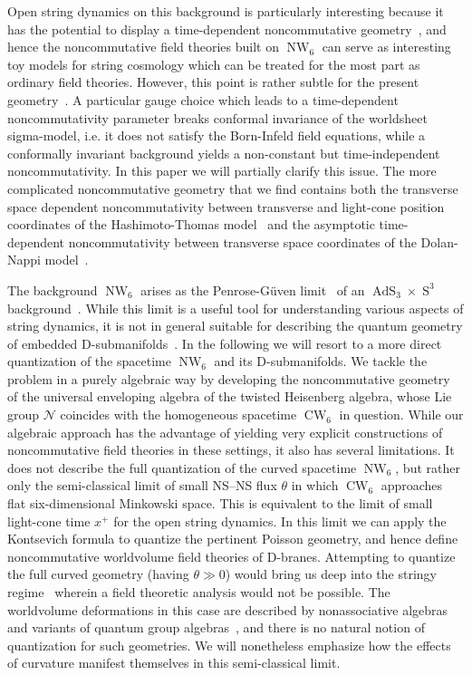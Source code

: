 \documentclass[11pt,a4paper]{article}
\DeclareMathOperator{\AdS}{AdS}
\DeclareMathOperator{\Sphere}{S}
\DeclareMathOperator{\NW}{NW}
\DeclareMathOperator{\CW}{CW}
\let\S\Sphere
\newcommand{\1}{\mathbb{1}}
\begin{document}
Open string dynamics on this background is particularly
interesting because it has the potential to display a time-dependent
noncommutative geometry~\cite{DN1,HashSethi1}, and hence the
noncommutative field theories built on $\NW_6$ can serve as
interesting toy models for string cosmology which can be treated for
the most part as ordinary field theories. However, this point is
rather subtle for the present geometry~\cite{DN1,HashTh2}. A
particular gauge choice which leads to a time-dependent
noncommutativity parameter breaks conformal invariance of the
worldsheet sigma-model, i.e. it does not satisfy the Born-Infeld field
equations, while a conformally invariant background yields a
non-constant but time-independent noncommutativity. In this paper we
will partially clarify this issue. The more complicated noncommutative
geometry that we find contains both the transverse space dependent
noncommutativity between transverse and light-cone position
coordinates of the Hashimoto-Thomas model~\cite{HashTh2} and the
asymptotic time-dependent noncommutativity between transverse space
coordinates of the Dolan-Nappi model~\cite{DN1}.

The background $\NW_6$ arises as the Penrose-G\"uven
limit~\cite{Penrose1,Guven1} of an $\AdS_3\times\S^3$
background~\cite{BF-OFP1}. While this limit is a useful tool for
understanding various aspects of string dynamics, it is not in general
suitable for describing the quantum geometry of embedded
D-submanifolds~\cite{HSz1}. In the following we will resort to a more
direct quantization of the spacetime $\NW_6$ and its
D-submanifolds. We tackle the problem in a purely algebraic way by
developing the noncommutative geometry of the
universal enveloping algebra of the twisted Heisenberg algebra, whose
Lie group $\mathcal{N}$ coincides with the homogeneous spacetime $\CW_6$ in
question. While our algebraic approach has the advantage of yielding
very explicit constructions of noncommutative field theories in
these settings, it also has several limitations. It does not describe
the full quantization of the curved spacetime $\NW_6$, but rather only
the semi-classical limit of small NS--NS flux $\theta$ in which $\CW_6$
approaches flat six-dimensional Minkowski space. This is equivalent to
the limit of small light-cone time $x^+$ for the open string
dynamics. In this limit we can apply the Kontsevich formula to
quantize the pertinent Poisson geometry, and hence define
noncommutative worldvolume field theories of D-branes. Attempting to
quantize the full curved geometry (having $\theta\gg0$) would bring
us deep into the stringy regime~\cite{HoYeh1} wherein a field
theoretic analysis would not be possible. The worldvolume deformations
in this case are described by nonassociative algebras and variants of
quantum group algebras~\cite{LorCorn1,ARS1}, and there is no natural
notion of quantization for such geometries. We will nonetheless
emphasize how the effects of curvature manifest themselves in this
semi-classical limit.
\end{document}
